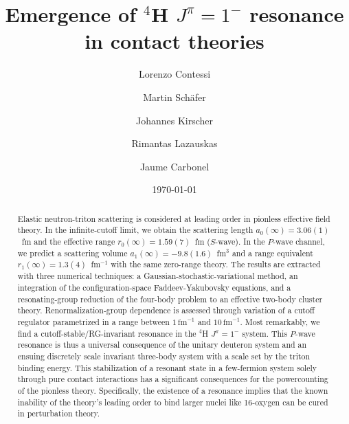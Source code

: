 \documentclass[5p,times]{elsarticle}
\begin{document}
\title{Emergence of $^4$H $J^\pi=1^-$ resonance in contact theories}

\author{Lorenzo Contessi}%
\address{Universit\'e Paris-Saclay, CNRS-IN2P3, IJCLab, 91405 Orsay, France}
\address{IRFU, CEA, Universit\'e Paris-Saclay, 91191 Gif-sur-Yvette, France}

\author{Martin Sch{\"a}fer}
\address{The Racah Institute of Physics, The Hebrew University, Jerusalem 9190401, Israel}

\author{Johannes Kirscher}
\address{Department of Physics, SRM University - AP, Amaravati 522502, Andhra Pradesh, India}

\author{Rimantas Lazauskas}
\address{IPHC, IN2P3-CNRS/Universit\'e de Strasbourg BP 28, F-67037 Strasbourg Cedex 2, France}

\author{Jaume Carbonel}
\address{Universit\'e Paris-Saclay, CNRS/IN2P3, IJCLab, 91405 Orsay, France}




\date{\today}



\begin{abstract}

Elastic neutron-triton scattering is considered at leading order in pionless effective field theory.
In the infinite-cutoff limit, we obtain the scattering length $a_0(\infty) = 3.06(1)$~fm
and the effective range $r_0(\infty) = 1.59(7)$~fm ($S$-wave). 
In the $P$-wave channel, we predict a scattering volume $a_1(\infty) = -9.8(1.6)$~fm$^3$
and a range equivalent $r_1(\infty) = 1.3(4)$~fm$^{-1}$ with the same zero-range theory. 
%
The results are extracted with three numerical techniques: a
Gaussian-stochastic-variational method, an integration of the configuration-space Faddeev-Yakubovsky 
equations, and a resonating-group reduction of the four-body problem to an effective two-body cluster theory. 
Renormalization-group dependence is assessed through variation of a cutoff regulator parametrized in a
range between $1\,\text{fm}^{-1}$ and $10\,\text{fm}^{-1}$.
%
Most remarkably, we find a cutoff-stable/RG-invariant resonance in the $^4$H $J^\pi=1^-$ system.
This $P$-wave resonance is thus a universal consequence of the unitary deuteron system
and an ensuing discretely scale invariant three-body system with a scale set by the triton binding energy.
%
This stabilization of a resonant state in a few-fermion system solely through pure contact interactions
has a significant consequences for the powercounting of the pionless theory.
Specifically, the existence of a resonance implies that the known inability of the theory's leading order
to bind larger nuclei like 16-oxygen can be cured in perturbation theory.
\end{abstract}
\end{document}
